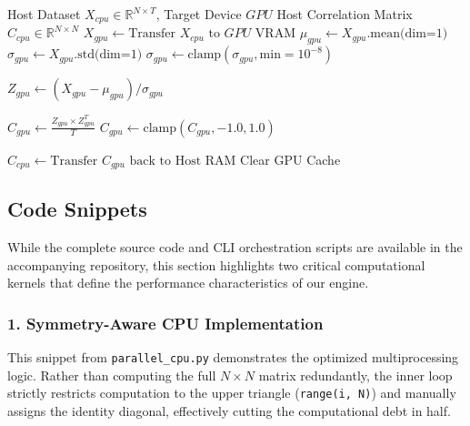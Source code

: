 \begin{minipage}{0.95\textwidth}
    \begin{algorithm}[H]
        \caption{Full GPU Tensor Acceleration Engine}
        \label{alg:gpu_full}
        \begin{algorithmic}[1]
        \Require Host Dataset $X_{cpu} \in \mathbb{R}^{N \times T}$, Target Device $GPU$
        \Ensure Host Correlation Matrix $C_{cpu} \in \mathbb{R}^{N \times N}$
            \State $X_{gpu} \gets \text{Transfer } X_{cpu} \text{ to } GPU$ VRAM
            \State $\mu_{gpu} \gets X_{gpu}\text{.mean(dim=1)}$ 
            \State $\sigma_{gpu} \gets X_{gpu}\text{.std(dim=1)}$ 
            \State $\sigma_{gpu} \gets \text{clamp}(\sigma_{gpu}, \text{min}=10^{-8})$ 
            
            \State $Z_{gpu} \gets (X_{gpu} - \mu_{gpu}) / \sigma_{gpu}$
            
            \State $C_{gpu} \gets \frac{Z_{gpu} \times Z_{gpu}^T}{T}$ 
            \State $C_{gpu} \gets \text{clamp}(C_{gpu}, -1.0, 1.0)$ 
            
            \State $C_{cpu} \gets \text{Transfer } C_{gpu} \text{ back to Host RAM}$
            \State Clear GPU Cache
        \end{algorithmic}
    \end{algorithm}
\end{minipage}


\subsection{Code Snippets}

While the complete source code and CLI orchestration scripts are available in the accompanying repository, this section highlights two critical computational kernels that define the performance characteristics of our engine. 

\subsubsection*{1. Symmetry-Aware CPU Implementation}
This snippet from \verb|parallel_cpu.py| demonstrates the optimized multiprocessing logic. Rather than computing the full $N \times N$ matrix redundantly, the inner loop strictly restricts computation to the upper triangle (\verb|range(i, N)|) and manually assigns the identity diagonal, effectively cutting the computational debt in half.

